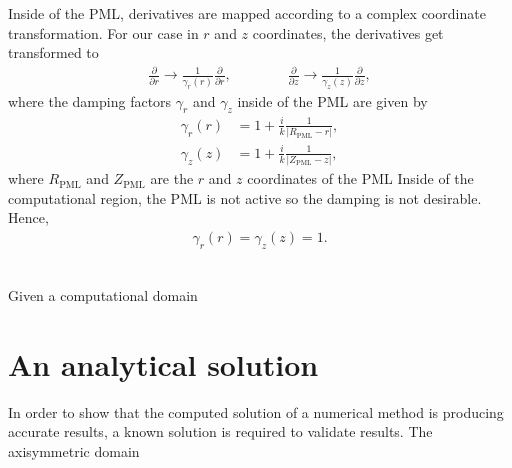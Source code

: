
Inside of the PML, derivatives are mapped according to a complex coordinate transformation.
For our case in $r$ and $z$ coordinates, the derivatives get transformed to
\begin{align}
	\frac{\partial}{\partial r} \rightarrow \frac{1}{\gamma_r(r)}\frac{\partial}{\partial r}, \qquad \qquad
	\frac{\partial}{\partial z} \rightarrow \frac{1}{\gamma_z(z)}\frac{\partial}{\partial z},
\end{align}
where the damping factors $\gamma_r$ and $\gamma_z$ inside of the PML are given by
\begin{align}
	\gamma_r(r) &= 1 + \frac{i}{k} \frac{1}{\left| R_{\text{PML}} - r \right|}, \\
	\gamma_z(z) &= 1 + \frac{i}{k} \frac{1}{\left| Z_{\text{PML}} - z \right|},
\end{align}
where $R_{\text{PML}}$ and $Z_{\text{PML}}$ are the $r$ and $z$ coordinates of the PML 
Inside of the computational region, the PML is not active so the damping is not desirable.
Hence,
\begin{align}
	\gamma_r(r) = \gamma_z(z) = 1.
\end{align}



\begin{align}
\end{align}

Given a computational domain 






\section{An analytical solution}

In order to show that the computed solution of a numerical method is producing accurate results, a known solution is required to validate results.
The axisymmetric domain

